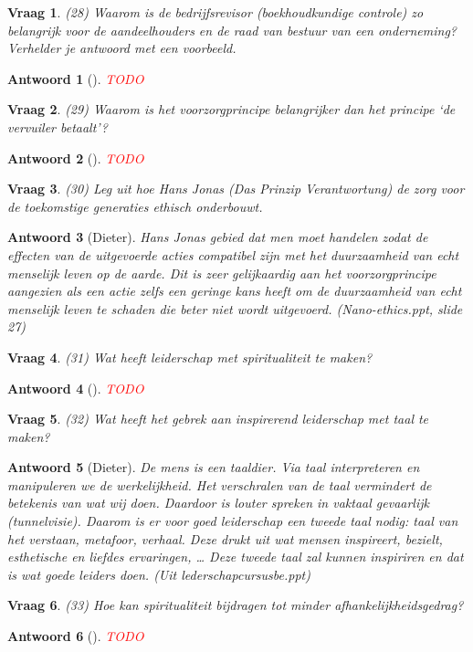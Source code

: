 \documentclass{article}
\theoremstyle{nonumberplain}
\newtheorem{question}{Vraag}
\newtheorem{answer}{Antwoord}
\begin{document}
\begin{question}
(28)	Waarom is de bedrijfsrevisor (boekhoudkundige controle) zo belangrijk voor de aandeelhouders en de raad van bestuur van een onderneming? Verhelder je antwoord met een voorbeeld.
\end{question}
\begin{answer}[]
\textcolor{red}{TODO}%
\end{answer}

\begin{question}
(29)	Waarom is het voorzorgprincipe belangrijker dan het principe `de vervuiler betaalt'? 
\end{question}
\begin{answer}[]
\textcolor{red}{TODO}%
\end{answer}

\begin{question}
(30)	Leg uit hoe Hans Jonas (Das Prinzip Verantwortung) de zorg voor de toekomstige generaties ethisch onderbouwt.
\end{question}
\begin{answer}[Dieter]
	Hans Jonas gebied dat men moet handelen zodat de effecten van de uitgevoerde acties compatibel zijn met het duurzaamheid van echt menselijk leven op de aarde.
	Dit is zeer gelijkaardig aan het voorzorgprincipe aangezien als een actie zelfs een geringe kans heeft om de duurzaamheid van echt menselijk leven te schaden die beter niet wordt uitgevoerd.
	\textit{(Nano-ethics.ppt, slide 27)}
\end{answer}

\begin{question}
(31)	Wat heeft leiderschap met spiritualiteit te maken? 
\end{question}
\begin{answer}[]
\textcolor{red}{TODO}%
\end{answer}

\begin{question}
(32)	Wat heeft het gebrek aan inspirerend leiderschap met taal te maken? 
\end{question}
\begin{answer}[Dieter]
	De mens is een taaldier.
	Via taal interpreteren en manipuleren we de werkelijkheid. 
	Het verschralen van de taal vermindert de betekenis van wat wij doen.
	Daardoor is louter spreken in vaktaal gevaarlijk (tunnelvisie).
	Daarom is er voor goed leiderschap een tweede taal nodig: taal van het verstaan, metafoor, verhaal.
	Deze drukt uit wat mensen inspireert, bezielt, esthetische en liefdes ervaringen, \dots
	Deze tweede taal zal kunnen inspiriren en dat is wat goede leiders doen.
	\textit{(Uit lederschapcursusbe.ppt)}
\end{answer}

\begin{question}
(33)	Hoe kan spiritualiteit bijdragen tot minder afhankelijkheidsgedrag? 
\end{question}
\begin{answer}[]
\textcolor{red}{TODO}%
\end{answer}

\nocite{*}
\printbibliography
\end{document}
